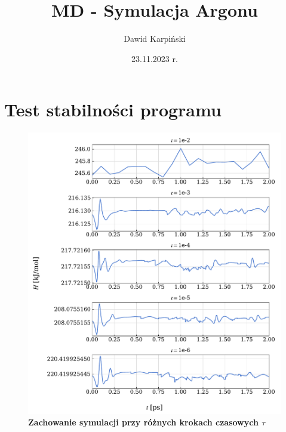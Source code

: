 \documentclass[11pt,a4paper]{article}
\begin{document}
\title{\textbf{MD - Symulacja Argonu}}
\author{Dawid Karpiński}
\date{23.11.2023 r.}
\maketitle
\pagebreak

\section{Test stabilności programu}

\begin{figure}[ht!]
    \caption{\textbf{Zachowanie symulacji przy różnych krokach czasowych $\tau$}}
    \vspace{0.2cm}
    \begin{multicols}{2}
        \includegraphics[width=\linewidth]{../figures/stability.pdf}

\end{multicols}
\end{figure}
\end{document}
